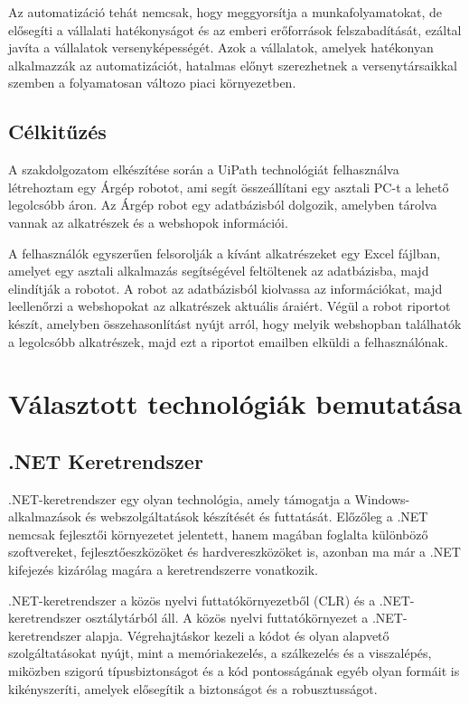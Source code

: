 \documentclass[
]{thesis-ekf}
\theoremstyle{definition}
\theoremstyle{remark}
\begin{document}
Az automatizáció tehát nemcsak, hogy meggyorsítja a munkafolyamatokat, de elősegíti a vállalati hatékonyságot és az emberi erőforrások felszabadítását,  ezáltal javíta a vállalatok versenyképességét. Azok a vállalatok, amelyek hatékonyan alkalmazzák az automatizációt, hatalmas előnyt szerezhetnek a versenytársaikkal szemben a folyamatosan változo piaci környezetben.


\section*{Célkitűzés}
A szakdolgozatom elkészítése során a UiPath technológiát felhasználva létrehoztam egy Árgép robotot, ami segít összeállítani egy asztali PC-t a lehető legolcsóbb áron. Az Árgép robot egy adatbázisból dolgozik, amelyben tárolva vannak az alkatrészek és a webshopok információi. 

A felhasználók egyszerűen felsorolják a kívánt alkatrészeket egy Excel fájlban, amelyet egy asztali alkalmazás segítségével feltöltenek az adatbázisba, majd elindítják a robotot. A robot az adatbázisból kiolvassa az információkat, majd leellenőrzi a webshopokat az alkatrészek aktuális áraiért. Végül a robot riportot készít, amelyben összehasonlítást nyújt arról, hogy melyik webshopban találhatók a legolcsóbb alkatrészek, majd ezt a riportot emailben elküldi a felhasználónak.


\chapter{Választott technológiák bemutatása}
\section{.NET Keretrendszer \cite{.NET}}
.NET-keretrendszer egy olyan technológia, amely támogatja a Windows-alkalmazások és webszolgáltatások készítését és futtatását. Előzőleg a .NET nemcsak fejlesztői környezetet jelentett, hanem magában foglalta különböző szoftvereket, fejlesztőeszközöket és hardvereszközöket is, azonban ma már a .NET kifejezés kizárólag magára a keretrendszerre vonatkozik.

.NET-keretrendszer a közös nyelvi futtatókörnyezetből (CLR) és a .NET- keretrendszer osztálytárból áll. A közös nyelvi futtatókörnyezet a .NET- keretrendszer alapja. Végrehajtáskor kezeli a kódot és olyan alapvető szolgáltatásokat nyújt, mint a memóriakezelés, a szálkezelés és a visszalépés, miközben szigorú típusbiztonságot és a kód pontosságának egyéb olyan formáit is kikényszeríti, amelyek elősegítik a biztonságot és a robusztusságot.
\end{document}
